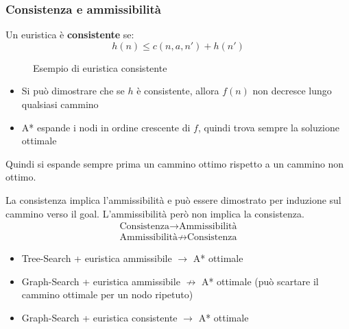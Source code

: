 \documentclass[a4paper]{article}
\begin{document}
\subsubsection{Consistenza e ammissibilità}
\begin{definition}
  Un euristica è \textbf{consistente} se:
  \[
    h(n) \le c(n,a,n') + h(n')
  \] 
  \begin{figure}[H]
    \centering
    \caption{Esempio di euristica consistente}
  \end{figure}
  \begin{itemize}
    \item Si può dimostrare che se \( h \) è consistente, allora \( f(n) \) non decresce
      lungo qualsiasi cammino

    \item A* espande i nodi in ordine crescente di \( f \), quindi trova sempre la soluzione
      ottimale
  \end{itemize}
  Quindi si espande sempre prima un cammino ottimo rispetto a un cammino non ottimo.
\end{definition}

\noindent
La consistenza implica l'ammissibilità e può essere dimostrato per induzione sul cammino
verso il goal. L'ammissibilità però non implica la consistenza.
\[
  \begin{aligned}
    \text{Consistenza} \to \text{Ammissibilità}\\
    \text{Ammissibilità} \not\to \text{Consistenza}
  \end{aligned}
\] 
\begin{itemize}
  \item Tree-Search + euristica ammissibile \( \to \) A* ottimale
  \item Graph-Search + euristica ammissibile \( \not\to \) A* ottimale (può scartare
    il cammino ottimale per un nodo ripetuto)
  \item Graph-Search + euristica consistente \( \to \) A* ottimale
\end{itemize}
\end{document}
